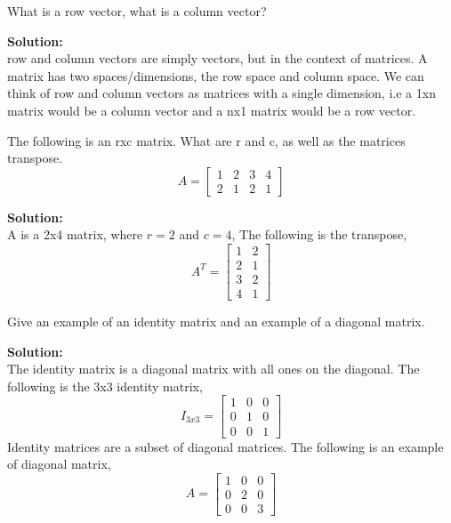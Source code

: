 \documentclass[12pt]{article}
\makeatletter
\theoremstyle{homework}
\newenvironment{exercise}[1]
{\def\@currentlabel{#1}\exercisecore}
{\endexercisecore}
\newcommand{\localhead}[1]{\par\smallskip\noindent\textbf{#1}\nobreak\\}%
\newcommand\solution{\localhead{Solution:}}
\makeatother
\begin{document}
\begin{exercise}{1} What is a row vector, what is a column vector?\\
  \solution row and column vectors are simply vectors, but in the context of matrices. A matrix has 
  two spaces/dimensions, the row space and column space. We can think of row and column vectors as matrices 
  with a single dimension, i.e a 1xn matrix would be a column vector and a nx1 matrix would be a row vector. 
\end{exercise}
\vspace{1in}

\begin{exercise}{2} The following is an rxc matrix. What are r and c, as well as the matrices transpose.
  \begin{equation*}
    A = \begin{bmatrix}
      1&2&3&4 \\
      2&1&2&1 
    \end{bmatrix}
  \end{equation*}
  \solution A is a 2x4 matrix, where $r = 2$ and $c = 4$, The following is the transpose, 
  \begin{equation*}
    A^T = \begin{bmatrix}
      1 & 2\\
      2 & 1\\
      3 & 2\\
      4 & 1
    \end{bmatrix}
  \end{equation*}
\end{exercise}
\vspace{1in}

\begin{exercise}{3} Give an example of an identity matrix and an example of a diagonal matrix.\\
  \solution The identity matrix is a diagonal matrix with all ones on the diagonal. The following is the 
  3x3 identity matrix, 
  \begin{equation*}
    I_{3x3} = \begin{bmatrix}
      1 &0 &0 \\
      0 &1 &0 \\
      0 &0 &1
    \end{bmatrix}
  \end{equation*}
  Identity matrices are a subset of diagonal matrices. The following is an example of diagonal matrix, 
  \begin{equation*}
    A = \begin{bmatrix}
      1 &0 &0 \\
      0 &2 &0 \\
      0 &0 &3
    \end{bmatrix}
  \end{equation*}
\end{exercise}
\vspace{1in}
\end{document}
